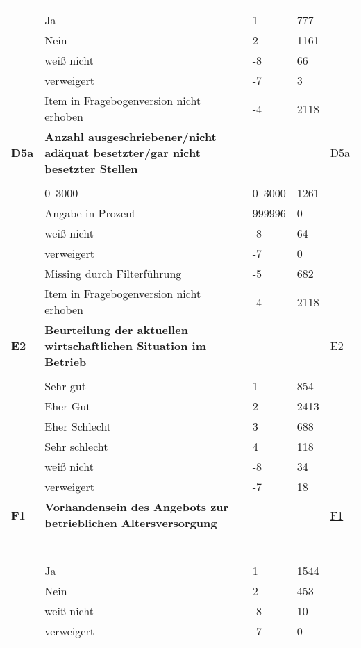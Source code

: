 \begin{longtable}{| L{2.5cm} | L{8.25cm}| C{1.5cm} | R{1.25cm} | C{2.25cm} |  }
   &  &  &  &  \\ 
   & Ja & 1 & 777 &  \\ 
   & Nein & 2 & 1161 &  \\ 
   & weiß nicht & -8 & 66 &  \\ 
   & verweigert & -7 & 3 &  \\ 
   & Item in Fragebogenversion nicht erhoben & -4 & 2118 &  \\ 
   \midrule
\textbf{D5a}\label{var:suf:D5a} & \textbf{Anzahl ausgeschriebener/nicht adäquat besetzter/gar nicht besetzter Stellen} &  &  & \hyperref[D5a]{D5a} \\ 
   &  &  &  &  \\ 
   & 0--3000 & 0--3000 & 1261 &  \\ 
   & Angabe in Prozent & 999996 & 0 &  \\ 
   & weiß nicht & -8 & 64 &  \\ 
   & verweigert & -7 & 0 &  \\ 
   & Missing durch Filterführung & -5 & 682 &  \\ 
   & Item in Fragebogenversion nicht erhoben & -4 & 2118 &  \\ 
   \midrule
\textbf{E2}\label{var:suf:E2} & \textbf{Beurteilung der aktuellen wirtschaftlichen Situation im Betrieb} &  &  & \hyperref[E2]{E2} \\ 
   &  &  &  &  \\ 
   & Sehr gut & 1 & 854 &  \\ 
   & Eher Gut & 2 & 2413 &  \\ 
   & Eher Schlecht & 3 & 688 &  \\ 
   & Sehr schlecht & 4 & 118 &  \\ 
   & weiß nicht & -8 & 34 &  \\ 
   & verweigert & -7 & 18 &  \\ 
   \midrule
\textbf{F1}\label{var:suf:F1} & \textbf{Vorhandensein des Angebots zur betrieblichen Altersversorgung} &  &  & \hyperref[F1]{F1} \\ 
   & \protect\subsection[Variablen F1 bis J1]{} &  &  &  \\ 
   & Ja & 1 & 1544 &  \\ 
   & Nein & 2 & 453 &  \\ 
   & weiß nicht & -8 & 10 &  \\ 
   & verweigert & -7 & 0 &  \\ 

\end{longtable}
